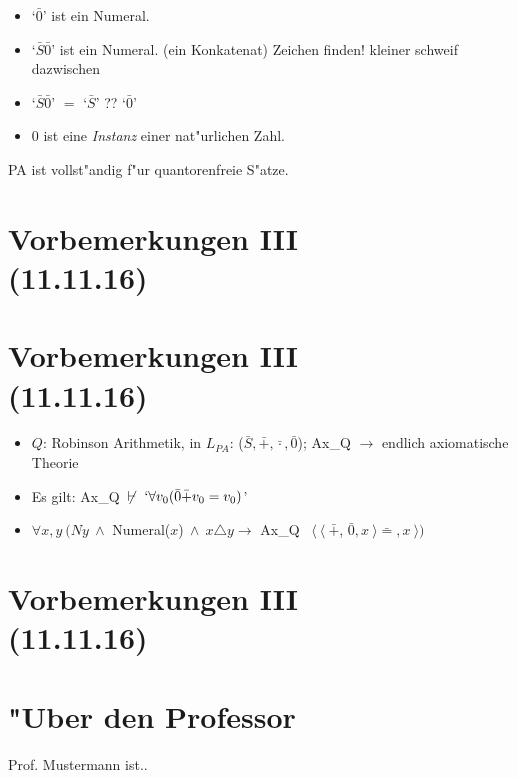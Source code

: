 \documentclass[]{scrartcl}
\begin{document}
\begin{itemize}
  \item `$\bar{0}$' ist ein Numeral.
  \item `$\bar{S}\bar{0}$' ist ein Numeral. (ein Konkatenat) Zeichen finden! kleiner schweif dazwischen
  \item `$\bar{S}\bar{0}$' $=$ `$\bar{S}$' ?? `$\bar{0}$'
  \item $0$ ist eine \emph{Instanz} einer nat"urlichen Zahl.
\end{itemize}

PA ist vollst"andig f"ur quantorenfreie S"atze.

\section{Vorbemerkungen III\\(11.11.16)}

\section{Vorbemerkungen III\\(11.11.16)}

\begin{itemize}
  \item $Q$: Robinson Arithmetik, in $L_{PA}$: ($\bar{S}, \bar{+}, \bar{\cdot}, \bar{0}$); Ax_{Q} $\rightarrow$ endlich axiomatische Theorie
  \item Es gilt: Ax_{Q}~$\not \vdash~`\forall v_{0} (\bar{0}\bar{+}v_{0}=v_{0})$'
  \item $\forall x, y~(Ny~\wedge$ Numeral($x$)$~\wedge~x \triangle y \rightarrow$ Ax_{Q} \vdash~$\langle~\langle~\bar{+}$, $\bar{0}, x~\rangle\bar{=}, x~\rangle )$
\end{itemize}

\section{Vorbemerkungen III\\(11.11.16)}





\newpage
\section{"Uber den Professor}
Prof. Mustermann ist..
\end{document}
